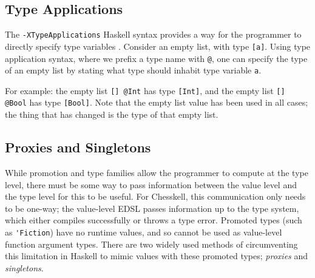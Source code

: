 \documentclass[12pt, a4paper, bibliography=totocnumbered]{scrreprt}
\newcommand{\inline}[1]{\lstinline[basicstyle=\ttfamily\footnotesize]{#1}}
\begin{document}




\subsection{Type Applications}

The \inline{-XTypeApplications} Haskell syntax provides a way for the programmer to directly specify type variables \cite{typeapplication}. Consider an empty list, with type \inline{[a]}. Using type application syntax, where we prefix a type name with \inline{@}, one can specify the type of an empty list by stating what type should inhabit type variable \inline{a}.

For example: the empty list \inline{[] @Int} has type \inline{[Int]}, and the empty list \inline{[] @Bool} has type \inline{[Bool]}. Note that the empty list value has been used in all cases; the thing that has changed is the type of that empty list.

\subsection{Proxies and Singletons}

While promotion and type families allow the programmer to compute at the type level, there must be some way to pass information between the value level and the type level for this to be useful. For Chesskell, this communication only needs to be one-way; the value-level EDSL passes information up to the type system, which either compiles successfully or throws a type error. Promoted types (such as \inline{'Fiction}) have no runtime values, and so cannot be used as value-level function argument types. There are two widely used methods of circumventing this limitation in Haskell to mimic values with these promoted types; \emph{proxies} and \emph{singletons}.
\end{document}
